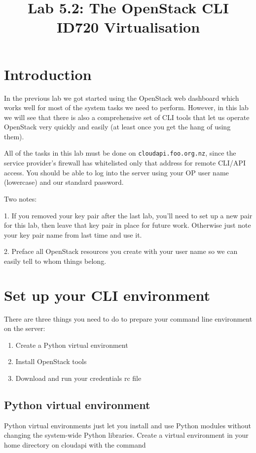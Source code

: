\documentclass{article}
\begin{document}
\title{Lab 5.2: The OpenStack CLI \\ ID720 Virtualisation}
\date{}
\maketitle

\section*{Introduction}
In the previous lab we got started using the OpenStack web dashboard which works well for most of the system tasks we need to perform. However, in this lab we will see that there is also a comprehensive set of CLI tools that let us operate OpenStack very quickly and easily (at least once you get the hang of using them).

All of the tasks in this lab must be done on \texttt{cloudapi.foo.org.nz}, since the service provider's firewall has whitelisted only that address for remote CLI/API access. You should be able to log into the server using your OP user name (lowercase) and our standard password.

Two notes:

1. If you removed your key pair after the last lab, you'll need to set up a new pair for this lab, then leave that key pair in place for future work. Otherwise just note your key pair name from last time and use it.

2. Preface all OpenStack resources you create with your user name so we can easily tell to whom things belong.

\section{Set up your CLI environment}
There are three things you need to do to prepare your command line environment on the server:

\begin{enumerate}
 \item Create a Python virtual environment
 \item Install OpenStack tools
 \item Download and run your credentials rc file
\end{enumerate}

 \subsection{Python virtual environment}
  Python virtual environments just let you install and use Python modules without changing the system-wide Python libraries. Create a virtual environment in your home directory on cloudapi with the command 
  
\end{document}
